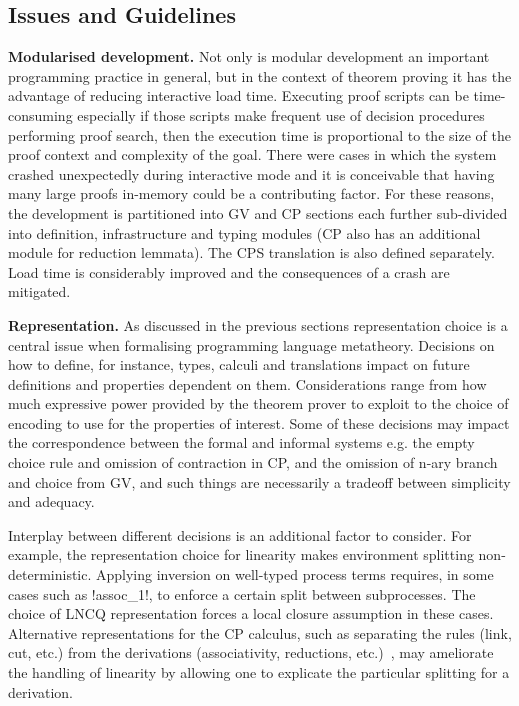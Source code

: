 \subsection{Issues and Guidelines}

\textbf{Modularised development.} Not only is modular development an important
programming practice in general, but in the context of theorem proving it has
the advantage of reducing interactive load time. Executing proof scripts can
be time-consuming especially if those scripts make frequent use of decision
procedures performing proof search, then the execution time is proportional to
the size of the proof context and complexity of the goal. There were cases in
which the system crashed unexpectedly during interactive mode and it is
conceivable that having many large proofs in-memory could be a contributing
factor. For these reasons, the development is partitioned into GV and CP
sections each further sub-divided into definition, infrastructure and typing
modules (CP also has an additional module for reduction lemmata). The CPS
translation is also defined separately. Load time is considerably improved and
the consequences of a crash are mitigated.

\textbf{Representation.} As discussed in the previous sections representation
choice is a central issue when formalising programming language
metatheory. Decisions on how to define, for instance, types, calculi and
translations impact on future definitions and properties dependent on
them. Considerations range from how much expressive power provided by the
theorem prover to exploit to the choice of encoding to use for the properties
of interest. Some of these decisions may impact the correspondence between the
formal and informal systems e.g. the empty choice rule and omission of
contraction in CP, and the omission of n-ary branch and choice from GV, and
such things are necessarily a tradeoff between simplicity and
adequacy.

Interplay between different decisions is an additional factor to consider. For
example, the representation choice for linearity makes environment splitting
non-deterministic. Applying inversion on well-typed process terms requires, in
some cases such as \coqe!assoc_1!, to enforce a certain split between
subprocesses. The choice of LNCQ representation forces a local closure
assumption in these cases. Alternative representations for the CP calculus,
such as separating the rules (link, cut, etc.) from the derivations
(associativity, reductions, etc.)~\cite{Tews:2013,Dawson:2010,Dawson:2002},
may ameliorate the handling of linearity by allowing one to explicate the
particular splitting for a derivation.

